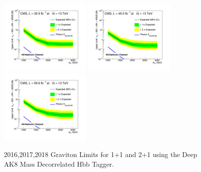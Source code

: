 \begin{figure}[!htb]
	\centering
	\includegraphics[width=0.4\textwidth]{Figures/limits_combine_35_9fb_dak8MDHbb_signals16_GravNar.png}
	\includegraphics[width=0.4\textwidth]{Figures/limits_combine_45_5fb_dak8MDHbb_signals17_GravNar.png}
	\includegraphics[width=0.4\textwidth]{Figures/limits_combine_59_6fb_dak8MDHbb_signals18_GravNar.png}
	\caption{2016,2017,2018 Graviton Limits for 1+1 and 2+1 using the Deep AK8 Mass Decorrelated Hbb Tagger.}
	\label{fig:GravitonLimit161718}
\end{figure}
\clearpage
